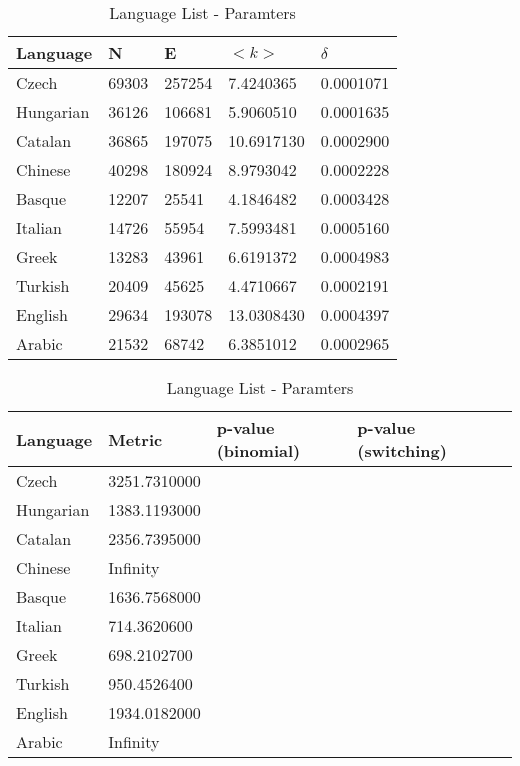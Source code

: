 \documentclass[12pt, a4paper]{article}
\begin{document}
\begin{table}[H]
    \centering
    \begin{tabular}{l l l l l}
    Language & N & E & $<k>$ & $\delta$ \\
     \hline
     Czech     & 69303 & 257254 & 7.4240365 & 0.0001071  \\
     Hungarian & 36126 & 106681 & 5.9060510 & 0.0001635  \\
     Catalan   & 36865 & 197075 & 10.6917130 & 0.0002900 \\ 
     Chinese   & 40298 & 180924 & 8.9793042 & 0.0002228  \\
     Basque    & 12207 & 25541 & 4.1846482 & 0.0003428  \\
     Italian   & 14726 & 55954 & 7.5993481 & 0.0005160  \\
     Greek     & 13283 & 43961 & 6.6191372 & 0.0004983  \\
     Turkish   & 20409 & 45625 & 4.4710667 & 0.0002191  \\
     English   & 29634 & 193078 & 13.0308430 & 0.0004397 \\ 
     Arabic    &   21532 & 68742 & 6.3851012 & 0.0002965 \\ 
    \end{tabular}
   \caption{Language List - Paramters}
   \label{table:1}
\end{table}

\begin{table}[H]
  \centering
  \begin{tabular}{l l l l l}
  Language & Metric & p-value (binomial) & p-value (switching)\\
   \hline
   Czech & 3251.7310000 & & \\
   Hungarian & 1383.1193000 & & \\
   Catalan & 2356.7395000 & & \\
   Chinese & Infinity & & \\
   Basque & 1636.7568000  & & \\
   Italian & 714.3620600 & & \\
   Greek & 698.2102700  & & \\
   Turkish & 950.4526400  & & \\
   English & 1934.0182000  & & \\
   Arabic & Infinity  & & \\
     \end{tabular}
 \caption{Language List - Paramters}
 \label{table:1}
\end{table}
\end{document}
